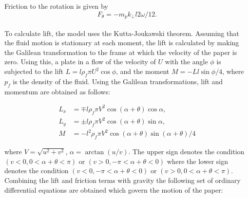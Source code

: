 Friction to the rotation is given by
\begin{equation}
F_{\theta} = -m_{p}k_{\perp}l{2}\omega/12.
\end{equation}
\\
To calculate lift, the model uses the Kutta-Joukawski theorem. Assuming that the fluid motion is stationary at each moment, the lift is calculated by making the Galilean transformation to the frame at which the velocity of the paper is zero. Using this, a plate in a flow of the velocity of $U$ with the angle $\phi$ is subjected to the lift $L=l\rho_{f}\pi U^{2}\cos{\phi}$, and the moment $M = -Ll\sin\phi/4$, where $p_{f}$ is the density of the fluid. Using the Galilean transformations, lift and momentum are obtained as follows:

\begin{equation}
\begin{split}
L_{x} & = \mp l\rho_{f}\pi V^{2}\cos(\alpha + \theta)\cos\alpha, \\
L_{y} & = \pm l\rho_{f}\pi V^{2}\cos(\alpha + \theta)\sin\alpha, \\
M & = -l^{2}\rho_{f}\pi V^{2}\cos(\alpha + \theta)\sin(\alpha + \theta)/4
\end{split}
\end{equation}

where $V = \sqrt{u^{2} + v^{2}}$, $\alpha = \arctan(u/v)$. The upper sign denotes the condition $(v < 0, 0 < \alpha + \theta < \pi)$ or $(v > 0, -\pi < \alpha + \theta < 0)$ where the lower sign denotes the condition $(v<0, -\pi < \alpha + \theta < 0)$ or $(v > 0, 0 < \alpha + \theta < \pi)$. Combining the lift and friction terms with gravity the following set of ordinary differential equations are obtained which govern the motion of the paper:

